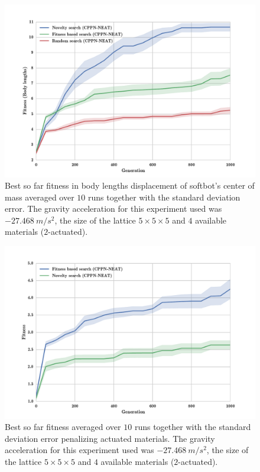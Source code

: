 \begin{figure}
\centering
\includegraphics[width=1.0\textwidth]{../Figures/Results/FitNovRandomSize5.pdf}
\caption{Best so far fitness in body lengths displacement of softbot's center of mass averaged over $10$ runs together with the standard deviation error. The gravity acceleration for this experiment used was $-27.468\   m/s^2$, the size of the lattice $5\times 5\times5$ and $4$ available materials ($2$-actuated).}
\label{fig:FitNovRandomSize5}
\end{figure}


\begin{figure}
\centering
\includegraphics[width=1.0\textwidth]{../Figures/Results/FitNovSize5Pen2.pdf}
\caption[]{Best so far fitness averaged over $10$ runs together with the standard deviation error penalizing actuated materials\footnotemark. The gravity acceleration for this experiment used was $-27.468\   m/s^2$, the size of the lattice $5\times 5\times5$ and $4$ available materials ($2$-actuated).}
\label{fig:FitNovRandomSize5}
\end{figure}


